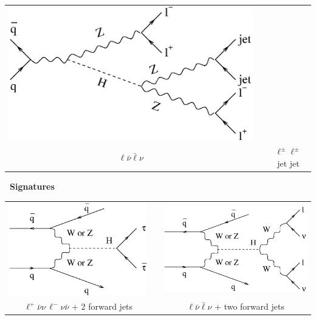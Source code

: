 \begin{slide*}
\begin{center}
\begin{tabular}[t]{c p{0.25cm} c}
    \includegraphics[scale=0.5]{signature_HB2.eps} \\
    $\ell \bar{\nu} \bar{\ell} \nu$ & &
    $\ell^\pm \ell^\pm$ jet jet \\
  \end{tabular}

  \vfill

  {\bf \lhc\ Signatures} \\
  \begin{tabular}[t]{c p{0.25cm} c}
    \includegraphics[scale=0.5]{signature_LB_correct.eps} & &
    \includegraphics[scale=0.5]{signature_HA_correct.eps} \\
    $\ell^+ \bar{\nu} \nu \, \ell^- \nu \bar{\nu}$ + 2 forward jets & &
    $\ell \bar{\nu} \bar{\ell} \nu$ + two forward jets \\
  \end{tabular}


\end{center}
\end{slide*}
